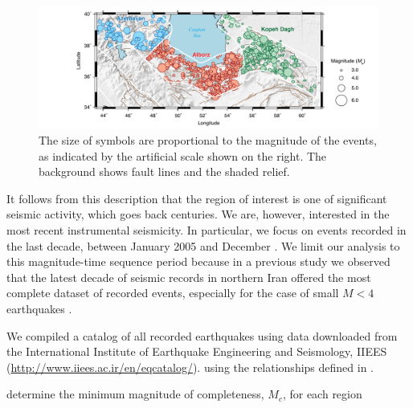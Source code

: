\begin{figure}[t]
	\centering
	\includegraphics[width=\textwidth]{figures/pdf/figure-03} 
	\caption{ The size of symbols are proportional to the magnitude of the events, as indicated by the artificial scale shown on the right. The background shows fault lines and the shaded relief.}
	\label{fig:seismicity}
\end{figure}

It follows from this description that the region of interest is one of significant seismic activity, which goes back centuries. We are, however, interested in the most recent instrumental seismicity. In particular, we focus on events recorded in the last decade, between January 2005 and December . We limit our analysis to this magnitude-time sequence period because in a previous study we observed that the latest decade of seismic records in northern Iran offered the most complete dataset of recorded events, especially for the case of small $M < 4$ earthquakes \citep{Khoshnevis2017}.

We compiled a catalog of all recorded earthquakes using data downloaded from the International Institute of Earthquake Engineering and Seismology, IIEES (\url{http://www.iiees.ac.ir/en/eqcatalog/}).  using the relationships defined in \citet{Zare2014}.

 determine the minimum magnitude of completeness, $M_c$, for each region

